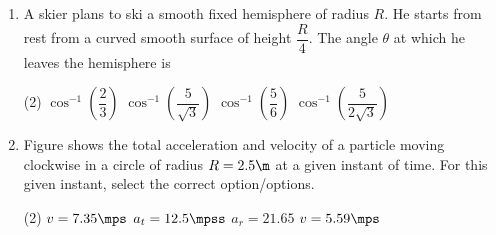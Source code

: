\documentclass{article}
\renewcommand{\ans}{\quad}
\begin{document}
\begin{enumerate}
    \item A skier plans to ski a smooth fixed hemisphere of radius $R$. He starts from rest from a curved smooth surface of height $\dfrac{R}{4}$. The angle $\theta$ at which he leaves the hemisphere is
    \begin{center}
    \end{center}
    \begin{tasks}(2)
        \task $\cos^{-1}\left(\dfrac{2}{3}\right)$
        \task $\cos^{-1}\left(\dfrac{5}{\sqrt{3}}\right)$
        \task $\cos^{-1}\left(\dfrac{5}{6}\right)$\ans
        \task $\cos^{-1}\left(\dfrac{5}{2\sqrt{3}}\right)$
    \end{tasks}

    \item Figure shows the total acceleration and velocity of a particle moving clockwise in a circle of radius $R=2.5\m$ at a given instant of time. For this given instant, select the correct option/options.
    \begin{center}
    \end{center}
    \begin{tasks}(2)
        \task $v=7.35\mps$\ans
        \task $a_t=12.5\mpss$\ans
        \task $a_r=21.65$\ans
        \task $v=5.59\mps$
    \end{tasks}

    


\end{enumerate}
\end{document}
